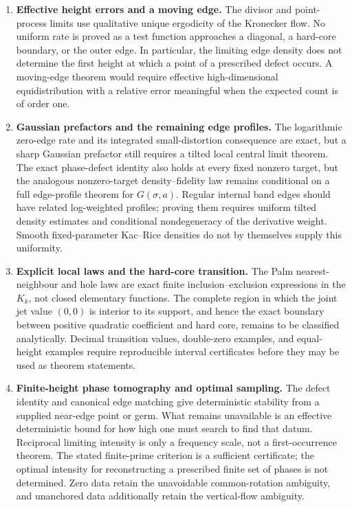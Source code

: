 \documentclass[11pt]{article}
\theoremstyle{definition}
\theoremstyle{remark}
\begin{document}
\begin{enumerate}
\item \textbf{Effective height errors and a moving edge.}
The divisor and point-process limits use qualitative unique ergodicity of the
Kronecker flow.  No uniform rate is proved as a test function approaches a
diagonal, a hard-core boundary, or the outer edge.  In particular, the limiting
edge density does not determine the first height at which a point of a prescribed
defect occurs.  A moving-edge theorem would require effective
high-dimensional equidistribution with a relative error meaningful when the
expected count is of order one.

\item \textbf{Gaussian prefactors and the remaining edge profiles.}
The logarithmic zero-edge rate and its integrated small-distortion consequence
are exact, but a sharp Gaussian prefactor still requires a tilted local central
limit theorem.  The exact phase-defect identity also holds at every fixed
nonzero target, but the analogous nonzero-target density--fidelity law remains
conditional on a full edge-profile theorem for $G(\sigma,a)$.  Regular internal
band edges should have related log-weighted profiles; proving them requires
uniform tilted density estimates and conditional nondegeneracy of the
derivative weight.  Smooth fixed-parameter Kac--Rice densities do not by
themselves supply this uniformity.

\item \textbf{Explicit local laws and the hard-core transition.}
The Palm nearest-neighbour and hole laws are exact finite
inclusion--exclusion expressions in the $K_k$, not closed elementary functions.
The complete region in which the joint jet value $(0,0)$ is interior to its
support, and hence the exact boundary between positive quadratic coefficient and
hard core, remains to be classified analytically.  Decimal transition values,
double-zero examples, and equal-height examples require reproducible interval
certificates before they may be used as theorem statements.

\item \textbf{Finite-height phase tomography and optimal sampling.}
The defect identity and canonical edge matching give deterministic stability
from a supplied near-edge point or germ.  What remains unavailable is an
effective deterministic bound for how high one must search to find that datum.
Reciprocal limiting intensity is only a frequency scale, not a first-occurrence
theorem.  The stated finite-prime criterion is a sufficient certificate; the
optimal intensity for reconstructing a prescribed finite set of phases is not
determined.  Zero data retain the unavoidable common-rotation ambiguity, and
unanchored data additionally retain the vertical-flow ambiguity.


\end{enumerate}
\end{document}
